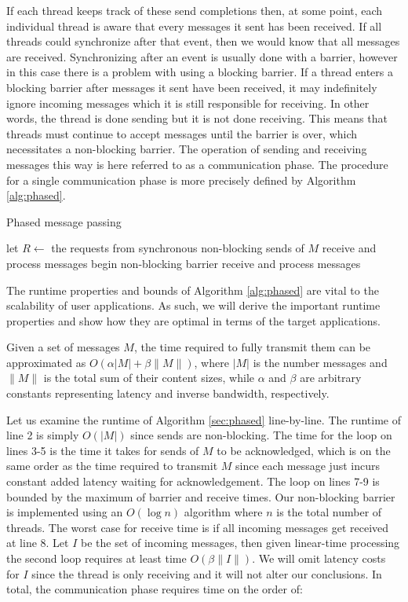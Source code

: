 \documentclass[final,1p,times]{elsarticle}
\begin{document}
If each thread keeps track of these send completions then,
at some point, each individual thread is aware that every
messages it sent has been received.
If all threads could synchronize after that event, then
we would know that all messages are received.
Synchronizing after an event is usually done with a barrier,
however in this case there is a problem with using a blocking barrier.
If a thread enters a blocking barrier after messages it sent
have been received, it may indefinitely ignore incoming messages
which it is still responsible for receiving.
In other words, the thread is done sending but it is not done receiving.
This means that threads must continue to accept messages until
the barrier is over, which necessitates a non-blocking barrier.
The operation of sending and receiving messages this way
is here referred to as a communication phase.
The procedure for a single communication phase is more precisely defined
by Algorithm \ref{alg:phased}.

\begin{algorithm}
\caption{Phased message passing}
\label{alg:phased}
\begin{algorithmic}[1]
\State let $R \gets$ the requests from synchronous non-blocking sends of $M$
\State receive and process messages
\EndWhile
\State begin non-blocking barrier
\State receive and process messages
\EndWhile
\EndFunction
\end{algorithmic}
\end{algorithm}

The runtime properties and bounds of Algorithm \ref{alg:phased} are vital
to the scalability of user applications.
As such, we will derive the important runtime properties and show how
they are optimal in terms of the target applications.

Given a set of messages $M$, the time required to fully transmit them
can be approximated as $O(\alpha|M| + \beta\|M\|)$, where
$|M|$ is the number messages and $\|M\|$ is the total sum of their
content sizes, while $\alpha$ and $\beta$ are arbitrary constants
representing latency and inverse bandwidth, respectively.

Let us examine the runtime of Algorithm \ref{sec:phased} line-by-line.
The runtime of line 2 is simply $O(|M|)$ since sends are non-blocking.
The time for the loop on lines 3-5 is the time it takes
for sends of $M$ to be acknowledged, which is on the same order
as the time required to transmit $M$ since each message just incurs
constant added latency waiting for acknowledgement.
The loop on lines 7-9 is bounded by the maximum of barrier and receive times.
Our non-blocking barrier is implemented using an $O(\log n)$ algorithm where
$n$ is the total number of threads.
The worst case for receive time is if all incoming messages get received at
line 8.
Let $I$ be the set of incoming messages, then given linear-time processing
the second loop requires at least time $O(\beta\|I\|)$.
We will omit latency costs for $I$ since the thread is only receiving
and it will not alter our conclusions.
In total, the communication phase requires time on the order of:
\end{document}
